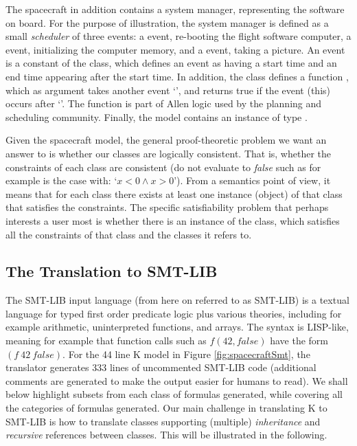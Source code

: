 The spacecraft in addition contains a system manager, representing the
software on board. For the purpose of illustration, the system manager
is defined as a small {\em scheduler} of three events: a 
event, re-booting the flight software computer, a 
event, initializing the computer memory, and a 
event, taking a picture. An event is a constant of the 
class, which defines an event as having a start time and an end time
appearing after the start time. In addition, the  class
defines a function , which as argument takes another event
`', and returns true if the event (this) occurs after
`'.  The  function is part of Allen logic
\cite{allen-logic-84} used by the planning and scheduling community.
%
Finally, the model contains an instance  of type
.

Given the spacecraft model, the general proof-theoretic problem we
want an answer to is whether our classes are logically
consistent. That is, whether the constraints of each class are
consistent (do not evaluate to {\em false} such as for example is the
case with: `$x < 0 \wedge x > 0$'). From a semantics point of view, it
means that for each class there exists at least one instance (object)
of that class that satisfies the constraints.  The specific
satisfiability problem that perhaps interests a user most is whether
there is an instance  of the  class,
which satisfies all the constraints of that class and the classes it
refers to.

\subsection{The Translation to SMT-LIB}

The SMT-LIB input language (from here on referred to as SMT-LIB) is a
textual language for typed first order predicate logic plus various
theories, including for example arithmetic, uninterpreted functions,
and arrays. The syntax is LISP-like, meaning for example that function
calls such as $f(42,false)$ have the form $(f\ 42\ false)$. For the 44
line K model in Figure \ref{fig:spacecraftSmt}, the translator
generates 333 lines of uncommented SMT-LIB code (additional comments
are generated to make the output easier for humans to read). We shall
below highlight subsets from each class of formulas generated, while
covering all the categories of formulas generated. Our main challenge
in translating K to SMT-LIB is how to translate classes 
supporting (multiple) {\em inheritance} and {\em recursive} references
between classes. This will be illustrated in the following.

